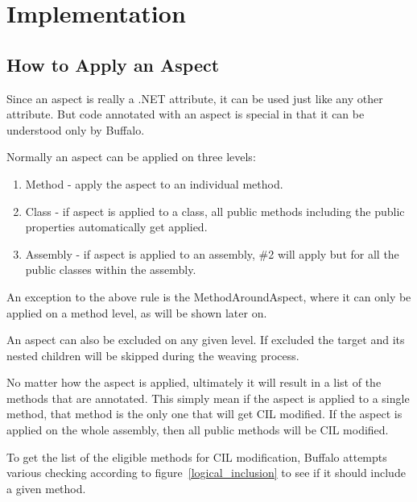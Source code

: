 \chapter{Implementation}

\section{How to Apply an Aspect}

Since an aspect is really a .NET attribute, it can be used just like any other attribute. But code annotated with an aspect is special in that it can be understood only by Buffalo.

Normally an aspect can be applied on three levels:

\begin{enumerate}
  \item Method - apply the aspect to an individual method.
  \item Class - if aspect is applied to a class, all public methods including the public properties automatically get applied.
  \item Assembly - if aspect is applied to an assembly, \#2 will apply but for all the public classes within the assembly.
\end{enumerate}

An exception to the above rule is the MethodAroundAspect, where it can only be applied on a method level, as will be shown later on.

An aspect can also be excluded on any given level. If excluded the target and its nested children will be skipped during the weaving process.

No matter how the aspect is applied, ultimately it will result in a list of the methods that are annotated. This simply mean if the aspect is applied to a single method, that method is the only one that will get CIL modified. If the aspect is applied on the whole assembly, then all public methods will be CIL modified.

To get the list of the eligible methods for CIL modification, Buffalo attempts various checking according to figure~\ref{logical_inclusion} to see if it should include a given method.

